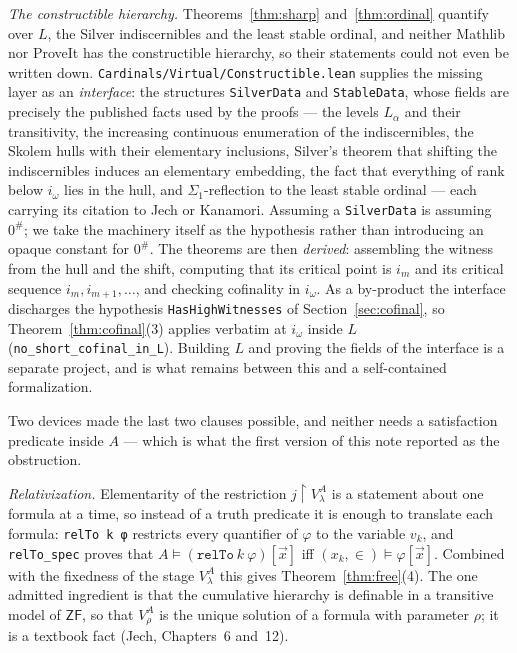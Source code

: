 \documentclass[11pt,letterpaper]{article}
\theoremstyle{definition}
\numberwithin{equation}{section}
\newcommand{\ZF}{\mathsf{ZF}}
\newcommand{\restr}{\mathbin{\upharpoonright}}
\begin{document}
\emph{The constructible hierarchy.} Theorems~\ref{thm:sharp} and~\ref{thm:ordinal} quantify over $L$, the Silver indiscernibles and the least stable ordinal, and neither Mathlib nor ProveIt has the constructible hierarchy, so their statements could not even be written down. \nolinkurl{Cardinals/Virtual/Constructible.lean} supplies the missing layer as an \emph{interface}: the structures \nolinkurl{SilverData} and \nolinkurl{StableData}, whose fields are precisely the published facts used by the proofs --- the levels $L_\alpha$ and their transitivity, the increasing continuous enumeration of the indiscernibles, the Skolem hulls with their elementary inclusions, Silver's theorem that shifting the indiscernibles induces an elementary embedding, the fact that everything of rank below $i_\omega$ lies in the hull, and $\Sigma_1$-reflection to the least stable ordinal --- each carrying its citation to Jech or Kanamori. Assuming a \nolinkurl{SilverData} is assuming $0^\#$; we take the machinery itself as the hypothesis rather than introducing an opaque constant for $0^\#$. The theorems are then \emph{derived}: assembling the witness from the hull and the shift, computing that its critical point is $i_m$ and its critical sequence $i_m,i_{m+1},\dots$, and checking cofinality in $i_\omega$. As a by-product the interface discharges the hypothesis \nolinkurl{HasHighWitnesses} of Section~\ref{sec:cofinal}, so Theorem~\ref{thm:cofinal}(3) applies verbatim at $i_\omega$ inside $L$ (\nolinkurl{no_short_cofinal_in_L}). Building $L$ and proving the fields of the interface is a separate project, and is what remains between this and a self-contained formalization.

Two devices made the last two clauses possible, and neither needs a satisfaction predicate inside $A$ --- which is what the first version of this note reported as the obstruction.

\emph{Relativization.} Elementarity of the restriction $j\restr V^A_\lambda$ is a statement about one formula at a time, so instead of a truth predicate it is enough to translate each formula: \nolinkurl{relTo k φ} restricts every quantifier of $\varphi$ to the variable $v_k$, and \nolinkurl{relTo_spec} proves that $A\models(\mathtt{relTo}\ k\ \varphi)[\vec x]$ iff $(x_k,\in)\models\varphi[\vec x]$. Combined with the fixedness of the stage $V^A_\lambda$ this gives Theorem~\ref{thm:free}(4). The one admitted ingredient is that the cumulative hierarchy is definable in a transitive model of $\ZF$, so that $V^A_\rho$ is the unique solution of a formula with parameter $\rho$; it is a textbook fact (Jech, Chapters~6 and~12).
\end{document}
